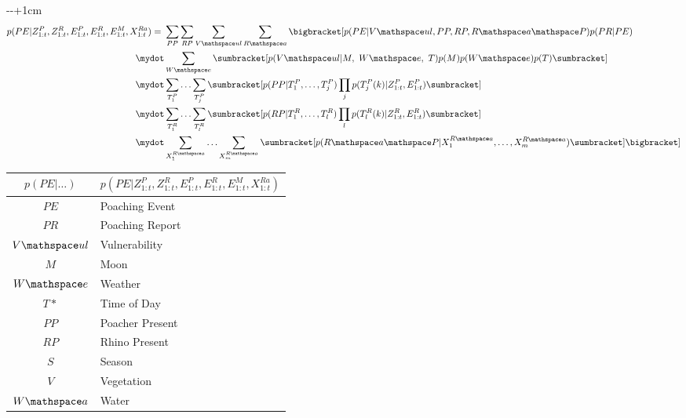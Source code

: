 \begin{adjustwidth}{-\oddsidemargin}{-\rightmargin+1cm}
	\begin{equation} \label{eq:app-monsterequationmarginalization}
		\begin{aligned}
		p(PE|Z_{1:t}^P,Z_{1:t}^R,E_{1:t}^P,E_{1:t}^R,E_{1:t}^M,X_{1:t}^{Ra}) =\ & \sum_{PP}\sum_{RP}\sum_{V\mathspace ul}\sum_{R\mathspace a} \bigbracket[ p(PE|V\mathspace ul,PP, RP, R\mathspace a\mathspace P)p(PR|PE)\\
		\mydot			& \sum_{W\mathspace e} \sumbracket[p(V\mathspace ul | M,\ W\mathspace e,\ T) p(M) p(W\mathspace e) p(T)\sumbracket]\\ 
		\mydot			& \sum_{T_1^P}\ldots\sum_{T_j^P} \sumbracket[p(PP|T_1^P,\ldots,T_j^P)\prod_{j} p(T_j^P(k)|Z_{1:t}^P,E_{1:t}^P)\sumbracket]\\
		\mydot			& \sum_{T_1^R}\ldots\sum_{T_l^R} \sumbracket[p(RP|T_1^R,\ldots,T_l^R)\prod_{l} p(T_l^R(k)|Z_{1:t}^R,E_{1:t}^R)\sumbracket]\\
		\mydot			& \sum_{X_1^{R\mathspace a}}\ldots\sum_{X_m^{R\mathspace a}}\sumbracket[p(R\mathspace a\mathspace P|X_1^{R\mathspace a},\ldots,X_m^{R\mathspace a})\sumbracket]\bigbracket]\\
		\end{aligned}
	\end{equation}
\end{adjustwidth}

\begin{tabular}{|c|l|}
	\hline
	$p(PE|\ldots)$ & $p(PE|Z_{1:t}^P,Z_{1:t}^R,E_{1:t}^P,E_{1:t}^R,E_{1:t}^M,X_{1:t}^{Ra})$\\
	\hline
	$PE$ & Poaching Event \\
	\hline
	$PR$ & Poaching Report \\
	\hline
	$V\mathspace ul$ & Vulnerability \\
	\hline
	$M$ & Moon \\
	\hline
	$W\mathspace e$ & Weather \\
	\hline
    $T\ast$ & Time of Day \\
    \hline
    $PP$ & Poacher Present \\
    \hline
    $RP$ & Rhino Present \\
    \hline
    $S$ & Season \\
    \hline
    $V$ & Vegetation \\
    \hline
    $W\mathspace a$ & Water \\
    \hline
\end{tabular}\\
\\